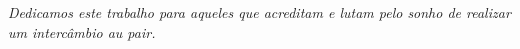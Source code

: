 \begin{dedicatoria}
   \vspace*{\fill}
   \centering
   \noindent
   \textit{Dedicamos este trabalho para aqueles que acreditam e lutam pelo sonho de realizar um intercâmbio au pair.}
   \vspace*{\fill}
\end{dedicatoria}
